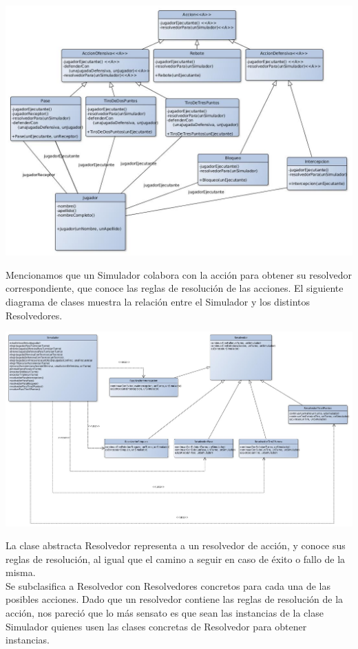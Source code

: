 \begin{center}
\includegraphics[scale=0.35]{diseno/acciones.jpg}
\end{center}

Mencionamos que un Simulador colabora con la acción para obtener su resolvedor correspondiente, que conoce las reglas de resolución de las acciones. El siguiente diagrama de clases muestra la relación entre el Simulador y los distintos Resolvedores.


\begin{center}
\includegraphics[scale=0.35, angle=90]{diseno/simuladorYResolvedor.jpg}
\end{center}

La clase abstracta Resolvedor representa a un resolvedor de acción, y conoce sus reglas de resolución, al igual que el camino a seguir en caso de éxito o fallo de la misma.\\
Se subclasifica a Resolvedor con Resolvedores concretos para cada una de las posibles acciones.
Dado que un resolvedor contiene las reglas de resolución de la acción, nos pareció que lo más sensato es que sean las instancias de la clase Simulador quienes usen las clases concretas de Resolvedor para obtener instancias.\\

